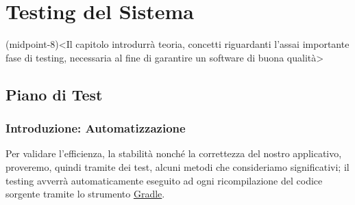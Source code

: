 \chapter[Documento di]{Testing del Sistema}(midpoint-8)<Il capitolo introdurrà teoria, concetti
riguardanti l'assai importante fase di testing, necessaria al fine di garantire un software di buona qualità>
\hypersetup{allcolors=\ddchaptercolor!60!black}

\section*{Piano di Test}
\subsection{Introduzione: Automatizzazione}
Per validare l'efficienza, la stabilità nonché la correttezza del nostro applicativo, proveremo,
quindi tramite dei test, alcuni metodi che consideriamo significativi; il testing avverrà automaticamente eseguito ad
ogni ricompilazione del codice sorgente tramite lo strumento \href{https://gradle.org/}{Gradle}.

